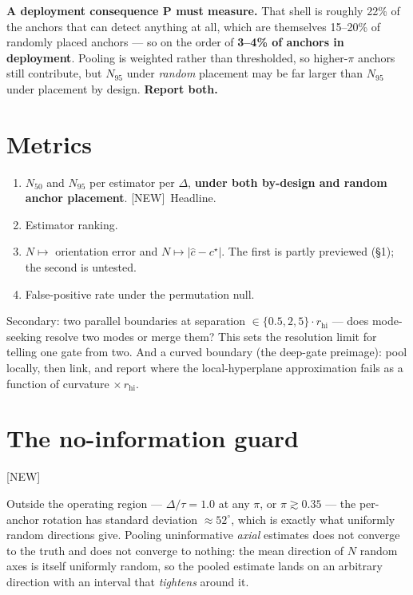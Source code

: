 \documentclass[11pt]{article}
\newcommand{\chat}{\hat{c}}
\newcommand{\provtag}[2]{{\footnotesize\sffamily\textcolor{#1}{[#2]}}}
\newcommand{\NEWT}{\provtag{newmag}{NEW}}
\begin{document}
\begin{limitbox}
\noindent\textbf{A deployment consequence P must measure.} That shell is roughly 22\% of the
anchors that can detect anything at all, which are themselves 15--20\% of randomly placed
anchors --- so on the order of \textbf{3--4\% of anchors in deployment}. Pooling is weighted
rather than thresholded, so higher-$\pi$ anchors still contribute, but $N_{95}$ under
\emph{random} placement may be far larger than $N_{95}$ under placement by design.
\textbf{Report both.}
\end{limitbox}

\section{Metrics}

\begin{enumerate}
\item $N_{50}$ and $N_{95}$ per estimator per $\Delta$, \textbf{under both by-design and random
anchor placement}. \NEWT\ Headline.
\item Estimator ranking.
\item $N \mapsto$ orientation error and $N \mapsto |\chat - c^\star|$. The first is partly
previewed (\S1); the second is untested.
\item False-positive rate under the permutation null.
\end{enumerate}

\noindent Secondary: two parallel boundaries at separation $\in \{0.5, 2, 5\}\cdot r_{\text{hi}}$
--- does mode-seeking resolve two modes or merge them? This sets the resolution limit for telling
one gate from two. And a curved boundary (the deep-gate preimage): pool locally, then link, and
report where the local-hyperplane approximation fails as a function of curvature $\times\,
r_{\text{hi}}$.

\section{The no-information guard} \NEWT

\begin{limitbox}
\noindent Outside the operating region --- $\Delta/\tau = 1.0$ at any $\pi$, or
$\pi \gtrsim 0.35$ --- the per-anchor rotation has standard deviation $\approx 52^\circ$, which
is exactly what uniformly random directions give. Pooling uninformative \emph{axial} estimates
does not converge to the truth and does not converge to nothing: the mean direction of $N$
random axes is itself uniformly random, so the pooled estimate lands on an arbitrary direction
with an interval that \emph{tightens} around it.
\end{limitbox}
\end{document}
